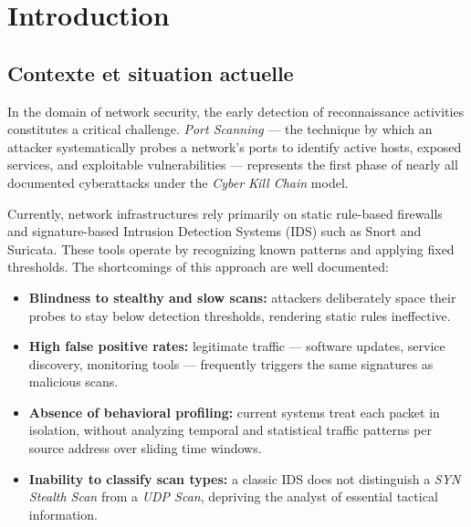 \documentclass[12pt,a4paper]{report}
\begin{document}
\tableofcontents
\clearpage

\chapter{Introduction}

\section{Contexte et situation actuelle}

In the domain of network security, the early detection of reconnaissance activities constitutes a critical challenge. \textit{Port Scanning} --- the technique by which an attacker systematically probes a network's ports to identify active hosts, exposed services, and exploitable vulnerabilities --- represents the first phase of nearly all documented cyberattacks under the \textit{Cyber Kill Chain} model.

Currently, network infrastructures rely primarily on static rule-based firewalls and signature-based Intrusion Detection Systems (IDS) such as Snort and Suricata. These tools operate by recognizing known patterns and applying fixed thresholds. The shortcomings of this approach are well documented:

\begin{itemize}[nosep,leftmargin=1.5em]
  \item \textbf{Blindness to stealthy and slow scans:} attackers deliberately space their probes to stay below detection thresholds, rendering static rules ineffective.
  \item \textbf{High false positive rates:} legitimate traffic --- software updates, service discovery, monitoring tools --- frequently triggers the same signatures as malicious scans.
  \item \textbf{Absence of behavioral profiling:} current systems treat each packet in isolation, without analyzing temporal and statistical traffic patterns per source address over sliding time windows.
  \item \textbf{Inability to classify scan types:} a classic IDS does not distinguish a \textit{SYN Stealth Scan} from a \textit{UDP Scan}, depriving the analyst of essential tactical information.
\end{itemize}
\end{document}
